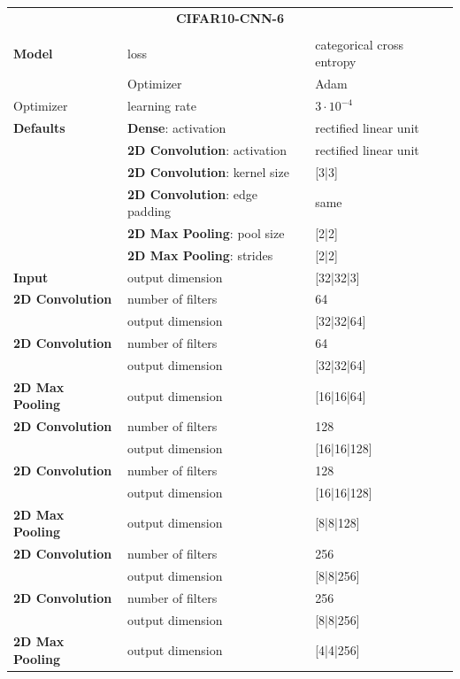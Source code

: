 	\begin{tabularx}{\textwidth}[!h]{X X X}
		\multicolumn{3}{c}{\textbf{CIFAR10-CNN-6}}\\
		\\
		\hline
		\endhead
		\textbf{Model} & loss & categorical cross entropy\\
		& Optimizer & Adam\\
		Optimizer & learning rate & $3 \cdot 10^{-4}$\\
		\hline
		\textbf{Defaults} & \textbf{Dense}: activation & rectified linear unit\\
		& \textbf{2D Convolution}: activation & rectified linear unit\\
		& \textbf{2D Convolution}: kernel size & [3|3]\\
		& \textbf{2D Convolution}: edge padding & same\\
		& \textbf{2D Max Pooling}: pool size & [2|2]\\
		& \textbf{2D Max Pooling}: strides & [2|2]\\
		\hline
		\textbf{Input} & output dimension & [32|32|3]\\
		[8pt]
		\textbf{2D Convolution} & number of filters & 64\\
		& output dimension & [32|32|64]\\
		[8pt]
		\textbf{2D Convolution} & number of filters & 64\\
		& output dimension & [32|32|64]\\
		[8pt]
		\textbf{2D Max Pooling} & output dimension & [16|16|64]\\
		[8pt]
		\textbf{2D Convolution} & number of filters & 128\\
		& output dimension & [16|16|128]\\
		[8pt]
		\textbf{2D Convolution} & number of filters & 128\\
		& output dimension & [16|16|128]\\
		[8pt]
		\textbf{2D Max Pooling} & output dimension & [8|8|128]\\
		[8pt]
		\textbf{2D Convolution} & number of filters & 256\\
		& output dimension & [8|8|256]\\
		[8pt]
		\textbf{2D Convolution} & number of filters & 256\\
		& output dimension & [8|8|256]\\
		[8pt]
		\textbf{2D Max Pooling} & output dimension & [4|4|256]\\

\end{tabularx}
